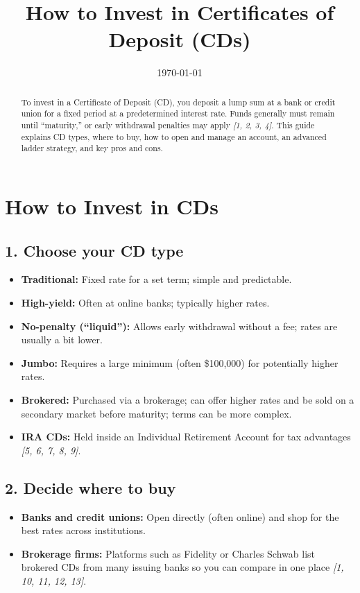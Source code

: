 \documentclass[11pt]{article}
\title{\textbf{How to Invest in Certificates of Deposit (CDs)}}
\author{}
\date{\today}
\begin{document}
\maketitle

\begin{abstract}
To invest in a Certificate of Deposit (CD), you deposit a lump sum at a bank or credit union for a fixed period at a predetermined interest rate. Funds generally must remain until ``maturity,'' or early withdrawal penalties may apply \textit{[1, 2, 3, 4]}. This guide explains CD types, where to buy, how to open and manage an account, an advanced ladder strategy, and key pros and cons.
\end{abstract}

\section*{How to Invest in CDs}

\subsection*{1. Choose your CD type}
\begin{itemize}
  \item \textbf{Traditional:} Fixed rate for a set term; simple and predictable.
  \item \textbf{High-yield:} Often at online banks; typically higher rates.
  \item \textbf{No-penalty (``liquid''):} Allows early withdrawal without a fee; rates are usually a bit lower.
  \item \textbf{Jumbo:} Requires a large minimum (often \$100{,}000) for potentially higher rates.
  \item \textbf{Brokered:} Purchased via a brokerage; can offer higher rates and be sold on a secondary market before maturity; terms can be more complex.
  \item \textbf{IRA CDs:} Held inside an Individual Retirement Account for tax advantages \textit{[5, 6, 7, 8, 9]}.
\end{itemize}

\subsection*{2. Decide where to buy}
\begin{itemize}
  \item \textbf{Banks and credit unions:} Open directly (often online) and shop for the best rates across institutions.
  \item \textbf{Brokerage firms:} Platforms such as Fidelity or Charles Schwab list brokered CDs from many issuing banks so you can compare in one place \textit{[1, 10, 11, 12, 13]}.
\end{itemize}
\end{document}
